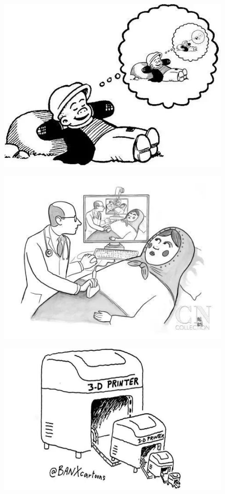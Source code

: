 \begin{figure}[H]
	\centering
	\includegraphics[scale=0.6]{img/C13/13-3/2.png}
\end{figure}

\begin{figure}[H]
	\centering
	\includegraphics[scale=0.6]{img/C13/13-3/3.png}
\end{figure}

\begin{figure}[H]
	\centering
	\includegraphics[scale=1.3]{img/C13/13-3/4.png}
\end{figure}

